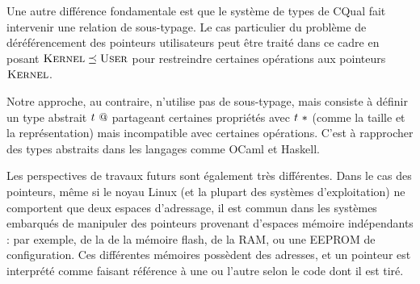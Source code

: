 Une autre différence fondamentale est que le système de types de CQual fait
intervenir une relation de sous-typage. Le cas particulier du problème de
déréférencement des pointeurs utilisateurs peut être traité dans ce cadre en
posant $\textsc{Kernel} \preceq \textsc{User}$ pour restreindre certaines opérations aux
pointeurs $\textsc{Kernel}$.

Notre approche, au contraire, n'utilise pas de sous-typage, mais consiste à
définir un type abstrait $t~@$ partageant certaines propriétés avec
$t~*$ (comme la taille et la représentation) mais incompatible avec
certaines opérations. C'est à rapprocher des types abstraits dans les langages
comme OCaml et Haskell.

Les perspectives de travaux futurs sont également très différentes. Dans le cas
des pointeurs, même si le noyau Linux (et la plupart des systèmes
d'exploitation) ne comportent que deux espaces d'adressage, il est commun dans
les systèmes embarqués de manipuler des pointeurs provenant d'espaces mémoire
indépendants : par exemple, de la de la mémoire flash, de la RAM, ou une EEPROM
de configuration. Ces différentes mémoires possèdent des adresses, et un
pointeur est interprété comme faisant référence à une ou l'autre selon le code
dont il est tiré.

